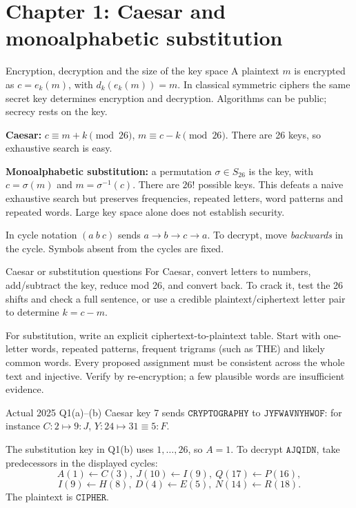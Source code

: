 \documentclass[11pt,a4paper]{article}
\begin{document}
\section{Chapter 1: Caesar and monoalphabetic substitution}
\begin{concept}{Encryption, decryption and the size of the key space}
A plaintext \(m\) is encrypted as \(c=e_k(m)\), with \(d_k(e_k(m))=m\). In classical symmetric ciphers the same secret key determines encryption and decryption. Algorithms can be public; secrecy rests on the key.

\textbf{Caesar:} \(c\equiv m+k\pmod{26}\), \(m\equiv c-k\pmod{26}\). There are 26 keys, so exhaustive search is easy.

\textbf{Monoalphabetic substitution:} a permutation \(\sigma\in S_{26}\) is the key, with \(c=\sigma(m)\) and \(m=\sigma^{-1}(c)\). There are \(26!\) possible keys. This defeats a naive exhaustive search but preserves frequencies, repeated letters, word patterns and repeated words. Large key space alone does not establish security.

In cycle notation \((a\ b\ c)\) sends \(a\to b\to c\to a\). To decrypt, move \emph{backwards} in the cycle. Symbols absent from the cycles are fixed.
\end{concept}
\begin{method}{Caesar or substitution questions}
For Caesar, convert letters to numbers, add/subtract the key, reduce mod 26, and convert back. To crack it, test the 26 shifts and check a full sentence, or use a credible plaintext/ciphertext letter pair to determine \(k=c-m\).

For substitution, write an explicit ciphertext-to-plaintext table. Start with one-letter words, repeated patterns, frequent trigrams (such as THE) and likely common words. Every proposed assignment must be consistent across the whole text and injective. Verify by re-encryption; a few plausible words are insufficient evidence.
\end{method}
\begin{example}{Actual 2025 Q1(a)--(b)}
Caesar key 7 sends \(\texttt{CRYPTOGRAPHY}\) to \(\texttt{JYFWAVNYHWOF}\): for instance \(C:2\mapsto9:J\), \(Y:24\mapsto31\equiv5:F\).

The substitution key in Q1(b) uses \(1,\ldots,26\), so \(A=1\). To decrypt \(\texttt{AJQIDN}\), take predecessors in the displayed cycles:
\[A(1)\leftarrow C(3),\ J(10)\leftarrow I(9),\ Q(17)\leftarrow P(16),\]
\[I(9)\leftarrow H(8),\ D(4)\leftarrow E(5),\ N(14)\leftarrow R(18).\]
The plaintext is \(\texttt{CIPHER}\).
\end{example}
\end{document}
